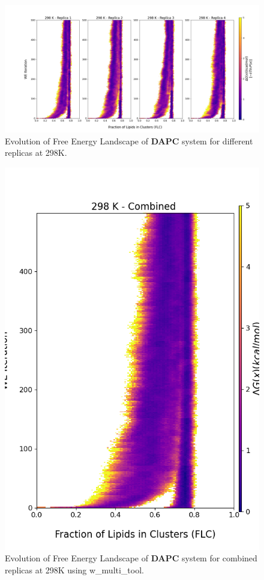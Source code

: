 \documentclass{biophys-new}
\begin{document}
\begin{figure}[hbt!]
\centering
\includegraphics[width=1.1\linewidth]{all_plots/ClusterLipids2Total/DPPC_DAPC_CHOL/298K/Evolution_DAPC_298_ClusterLipids2Total.png}
\caption{Evolution of Free Energy Landscape of \textbf{DAPC} system for different replicas at 298K.}
\label{fig:view}

\end{figure}

\begin{figure}[hbt!]
\centering
\includegraphics[width=0.8\linewidth]{all_plots/ClusterLipids2Total/DPPC_DAPC_CHOL/298K/Evolution_DAPC_MULTI__298_ClusterLipids2Total.png}
\caption{Evolution of Free Energy Landscape of \textbf{DAPC} system for combined replicas at 298K using w\_multi\_tool.}
\label{fig:view}

\end{figure}
\end{document}
